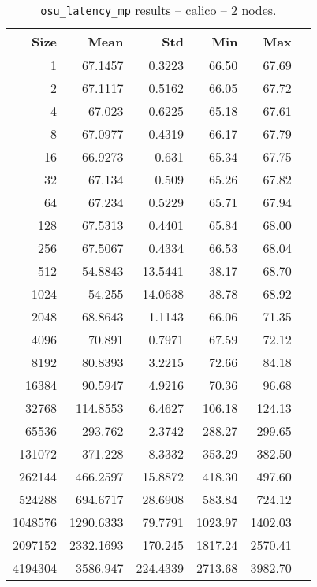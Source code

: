 \begin{table}[htbp]
\hfill
\begin{minipage}{.48\textwidth}
    \centering
    \footnotesize
  \begin{tabular}{rrrrrr}
	\toprule
	\textbf{Size} & \textbf{Mean} & \textbf{Std} & \textbf{Min} & \textbf{Max}	\\
	\midrule
	1	&	67.1457   	&	0.3223	&	66.50	&	67.69	\\
	2	&	67.1117   	&	0.5162	&	66.05	&	67.72	\\
	4	&	67.023   	&	0.6225	&	65.18	&	67.61	\\
	8	&	67.0977   	&	0.4319	&	66.17	&	67.79	\\
	16	&	66.9273   	&	0.631	&	65.34	&	67.75	\\
	32	&	67.134   	&	0.509	&	65.26	&	67.82	\\
	64	&	67.234   	&	0.5229	&	65.71	&	67.94	\\
	128	&	67.5313   	&	0.4401	&	65.84	&	68.00	\\
	256	&	67.5067   	&	0.4334	&	66.53	&	68.04	\\
	512	&	54.8843   	&	13.5441	&	38.17	&	68.70	\\
	1024	&	54.255   	&	14.0638	&	38.78	&	68.92	\\
	2048	&	68.8643   	&	1.1143	&	66.06	&	71.35	\\
	4096	&	70.891   	&	0.7971	&	67.59	&	72.12	\\
	8192	&	80.8393   	&	3.2215	&	72.66	&	84.18	\\
	16384	&	90.5947   	&	4.9216	&	70.36	&	96.68	\\
	32768	&	114.8553   	&	6.4627	&	106.18	&	124.13	\\
	65536	&	293.762   	&	2.3742	&	288.27	&	299.65	\\
	131072	&	371.228   	&	8.3332	&	353.29	&	382.50	\\
	262144	&	466.2597   	&	15.8872	&	418.30	&	497.60	\\
	524288	&	694.6717   	&	28.6908	&	583.84	&	724.12	\\
	1048576	&	1290.6333   	&	79.7791	&	1023.97	&	1402.03	\\
	2097152	&	2332.1693   	&	170.245	&	1817.24	&	2570.41	\\
	4194304	&	3586.947   	&	224.4339	&	2713.68	&	3982.70	\\
	\bottomrule
	\end{tabular}
  \caption{\texttt{osu\_latency\_mp} results -- calico -- 2 nodes.}
  \label{tab:latency-mp-calico-2nodes}
  \end{minipage}
\end{table}


